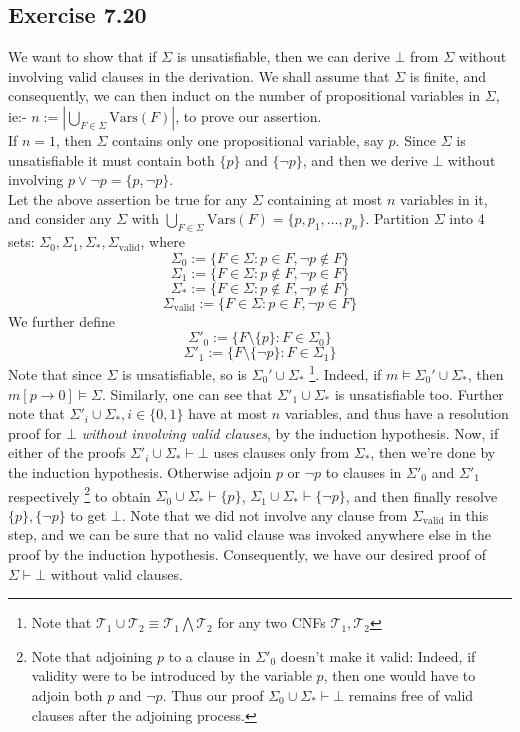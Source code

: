 \documentclass{article}
\newcommand{\Vars}{\mathrm{Vars}}
\begin{document}
\subsection*{Exercise 7.20}
We want to show that if $\Sigma$ is unsatisfiable, then we can derive $\bot$ from $\Sigma$ without involving valid clauses in the derivation. We shall assume that $\Sigma$ is finite, and consequently, we can then induct on the number of propositional variables in $\Sigma$, ie:- $n:= \left|\bigcup_{F\in\Sigma}\Vars(F)\right|$, to prove our assertion.\\
If $n = 1$, then $\Sigma$ contains only one propositional variable, say $p$. Since $\Sigma$ is unsatisfiable it must contain both $\{p\}$ and $\{\lnot p\}$, and then we derive $\bot$ without involving $p\lor\lnot p = \{p, \lnot p\}$.\\
Let the above assertion be true for any $\Sigma$ containing at most $n$ variables in it, and consider any $\Sigma$ with $\bigcup_{F\in\Sigma}\Vars(F) = \{p, p_1, \ldots, p_n\}$. Partition $\Sigma$ into 4 sets: $\Sigma_0, \Sigma_1, \Sigma_*, \Sigma_{\mathrm{valid}}$, where 
$$\Sigma_0:= \{F\in\Sigma: p\in F, \lnot p\not\in F\}$$
$$\Sigma_1:= \{F\in\Sigma: p\not\in F, \lnot p\in F\}$$
$$\Sigma_*:= \{F\in\Sigma: p\not\in F, \lnot p\not\in F\}$$
$$\Sigma_{\mathrm{valid}} := \{F\in\Sigma: p\in F, \lnot p\in F\}$$
We further define
$$\Sigma'_0 := \{F\setminus\{p\}: F\in\Sigma_0\}$$
$$\Sigma'_1 := \{F\setminus\{\lnot p\}: F\in\Sigma_1\}$$
Note that since $\Sigma$ is unsatisfiable, so is $\Sigma_0'\cup\Sigma_*$ \footnote{Note that $\mathcal{T}_1\cup\mathcal{T}_2 \equiv \mathcal{T}_1\bigwedge\mathcal{T}_2$ for any two CNFs $\mathcal{T}_1, \mathcal{T}_2$}. Indeed, if $m\models\Sigma_0'\cup\Sigma_*$, then $m[p\rightarrow 0]\models\Sigma$. Similarly, one can see that $\Sigma'_1\cup\Sigma_*$ is unsatisfiable too. Further note that $\Sigma'_i\cup\Sigma_*, i\in\{0, 1\}$ have at most $n$ variables, and thus have a resolution proof for $\bot$ \emph{without involving valid clauses}, by the induction hypothesis. Now, if either of the proofs $\Sigma'_i\cup\Sigma_*\vdash\bot$ uses clauses only from $\Sigma_*$, then we're done by the induction hypothesis. Otherwise adjoin $p$ or $\lnot p$ to clauses in $\Sigma'_0$ and $\Sigma'_1$ respectively \footnote{Note that adjoining $p$ to a clause in $\Sigma'_0$ doesn't make it valid: Indeed, if validity were to be introduced by the variable $p$, then one would have to adjoin both $p$ and $\lnot p$. Thus our proof $\Sigma_0\cup\Sigma_*\vdash\bot$ remains free of valid clauses after the adjoining process.} to obtain $\Sigma_0\cup\Sigma_*\vdash\{p\}$, $\Sigma_1\cup\Sigma_*\vdash\{\lnot p\}$, and then finally resolve $\{p\}, \{\lnot p\}$ to get $\bot$. Note that we did not involve any clause from $\Sigma_{\mathrm{valid}}$ in this step, and we can be sure that no valid clause was invoked anywhere else in the proof by the induction hypothesis. Consequently, we have our desired proof of $\Sigma\vdash\bot$ without valid clauses.
\end{document}
